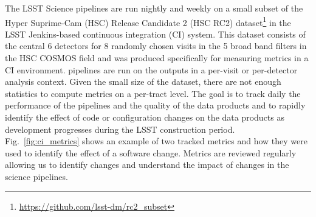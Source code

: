 The LSST Science pipelines are run nightly and weekly on a small subset of the Hyper Suprime-Cam (HSC) Release Candidate 2 (HSC RC2) dataset\footnote{\url{https://github.com/lsst-dm/rc2_subset}} in the LSST Jenkins-based continuous integration (CI) system\cite{2018SPIE10707E..09J}.
This dataset consists of the central 6 detectors for 8 randomly chosen visits in the 5 broad band filters in the HSC COSMOS field and was produced specifically for measuring metrics in a CI environment.
\faro pipelines are run on the outputs in a per-visit or per-detector analysis context.
Given the small size of the dataset, there are not enough statistics to compute metrics on a per-tract level.
The goal is to track daily the performance of the pipelines and the quality of the data products and to rapidly identify the effect of code or configuration changes on the data products as development progresses during the LSST construction period.
Fig.~\ref{fig:ci_metrics} shows an example of two tracked metrics and how they were used to identify the effect of a software change.
Metrics are reviewed regularly allowing us to identify changes and understand the impact of changes in the science pipelines.
